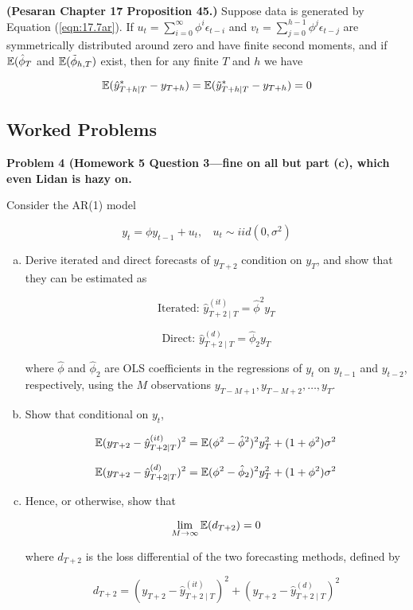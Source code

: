 \begin{proposition}\textbf{(Pesaran Chapter 17 Proposition 45.)} Suppose data is generated by Equation (\ref{eqn:17.7ar}). If \(u_t = \sum_{i=0}^\infty \phi^i \epsilon_{t-i}\) and \(v_t = \sum_{j=0}^{h-1} \phi^j \epsilon_{t-j}\) are symmetrically distributed around zero and have finite second moments, and if \(\mathbb{E}(\hat{\phi}_T\) and \(\mathbb{E}(\tilde{\phi}_{h,T} )\) exist, then for any finite \(T\) and \(h\) we have

\[
\mathbb{E}(\hat{y}_{T+h \mid T}^* - y_{T +h}) = \mathbb{E} (\tilde{y}_{T+h \mid T}^* - y_{T+h}) = 0
\]
\end{proposition}

\subsection{Worked Problems}

\textbf{Problem 4 (Homework 5 Question 3---fine on all but part (c), which even Lidan is hazy on.}

Consider the AR(1) model

\begin{equation} \label{eqn:17.7ar}
y_t =  \phi y_{t-1} + u_t, \ \ \ \ u_t \sim iid(0, \sigma^2)
\end{equation}

\begin{enumerate}[(a)]

\item Derive iterated and direct forecasts of \(y_{T+2}\) condition on \(y_T\), and show that they can be estimated as 

\[
\text{Iterated: } \hat{y}_{T+2\mid T}^{(it)} = \hat{\phi}^2 y_T
\]

\[
\text{Direct: } \hat{y}_{T+2\mid T}^{(d)} = \hat{\phi}_2 y_T
\]

where \(\hat{\phi}\) and \( \hat{\phi}_2\) are OLS coefficients in the regressions of \(y_t\) on \(y_{t-1}\) and \(y_{t-2}\), respectively, using the \(M\) observations \(y_{T-M+1}, y_{T-M+2}, \ldots, y_{T}\).

\item Show that conditional on \(y_t\),

\[
\mathbb{E}(y_{T+2} - \hat{y}_{T+2\mid T}^{(it)})^2 = \mathbb{E}(\phi^2 - \hat{\phi}^2)^2 y_T^2 + (1 + \phi^2)\sigma^2
\]

\[
\mathbb{E}(y_{T+2} - \hat{y}_{T+2\mid T}^{(d)})^2 = \mathbb{E}(\phi^2 - \hat{\phi}_2)^2 y_T^2 + (1 + \phi^2)\sigma^2
\]

\item Hence, or otherwise, show that

\[
\lim_{M \to \infty} \mathbb{E}(d_{T+2}) = 0
\]

where \(d_{T+2}\) is the loss differential of the two forecasting methods, defined by

\[
d_{T+2} = (y_{T+2}- \hat{y}_{T+2\mid T}^{(it)})^2 + (y_{T+2} - \hat{y}_{T+2\mid T}^{(d)})^2
\]

\end{enumerate}

